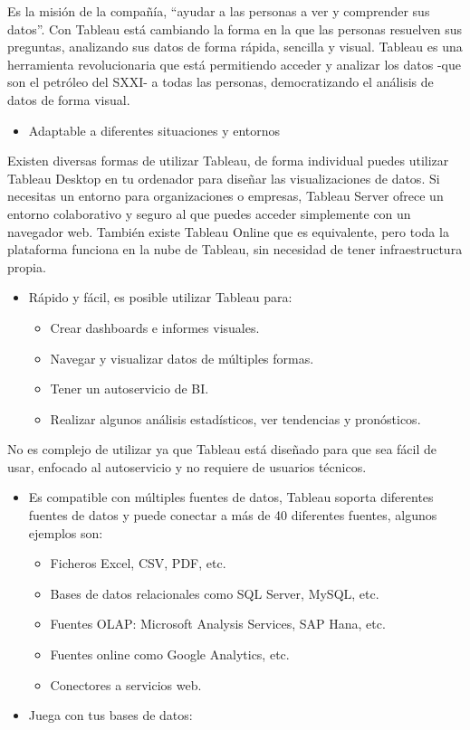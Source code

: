 \documentclass[
]{book}
\providecommand{\tightlist}{%
  \setlength{\itemsep}{0pt}\setlength{\parskip}{0pt}}
\begin{document}
Es la misión de la compañía, ``ayudar a las personas a ver y comprender sus datos''. Con Tableau está cambiando la forma en la que las personas resuelven sus preguntas, analizando sus datos de forma rápida, sencilla y visual.
Tableau es una herramienta revolucionaria que está permitiendo acceder y analizar los datos -que son el petróleo del SXXI- a todas las personas, democratizando el análisis de datos de forma visual.

\begin{itemize}
\tightlist
\item
  Adaptable a diferentes situaciones y entornos
\end{itemize}

Existen diversas formas de utilizar Tableau, de forma individual puedes utilizar Tableau Desktop en tu ordenador para diseñar las visualizaciones de datos.
Si necesitas un entorno para organizaciones o empresas, Tableau Server ofrece un entorno colaborativo y seguro al que puedes acceder simplemente con un navegador web. También existe Tableau Online que es equivalente, pero toda la plataforma funciona en la nube de Tableau, sin necesidad de tener infraestructura propia.

\begin{itemize}
\tightlist
\item
  Rápido y fácil, es posible utilizar Tableau para:

  \begin{itemize}
  \tightlist
  \item
    Crear dashboards e informes visuales.
  \item
    Navegar y visualizar datos de múltiples formas.
  \item
    Tener un autoservicio de BI.
  \item
    Realizar algunos análisis estadísticos, ver tendencias y pronósticos.
  \end{itemize}
\end{itemize}

No es complejo de utilizar ya que Tableau está diseñado para que sea fácil de usar, enfocado al autoservicio y no requiere de usuarios técnicos.

\begin{itemize}
\tightlist
\item
  Es compatible con múltiples fuentes de datos, Tableau soporta diferentes fuentes de datos y puede conectar a más de 40 diferentes fuentes, algunos ejemplos son:

  \begin{itemize}
  \tightlist
  \item
    Ficheros Excel, CSV, PDF, etc.
  \item
    Bases de datos relacionales como SQL Server, MySQL, etc.
  \item
    Fuentes OLAP: Microsoft Analysis Services, SAP Hana, etc.
  \item
    Fuentes online como Google Analytics, etc.
  \item
    Conectores a servicios web.
  \end{itemize}
\item
  Juega con tus bases de datos:
\end{itemize}
\end{document}
